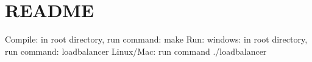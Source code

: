 \chapter{README}
\hypertarget{md__r_e_a_d_m_e}{}\label{md__r_e_a_d_m_e}
Compile\+: in root directory, run command\+: make Run\+: windows\+: in root directory, run command\+: loadbalancer Linux/\+Mac\+: run command ./loadbalancer 